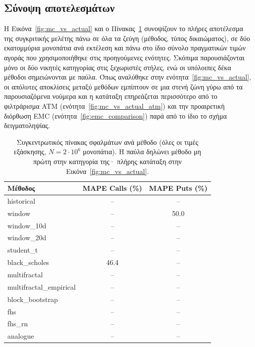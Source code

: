 \documentclass[12pt]{article}
\begin{document}
\subsection{Σύνοψη αποτελεσμάτων}

Η Εικόνα~\ref{fig:mc_vs_actual} και ο Πίνακας~\ref{tab:summary} συνοψίζουν το πλήρες αποτέλεσμα της συγκριτικής μελέτης πάνω σε όλα τα ζεύγη (μέθοδος, τύπος δικαιώματος), σε δύο εκατομμύρια μονοπάτια ανά εκτέλεση και πάνω στο ίδιο σύνολο πραγματικών τιμών αγοράς που χρησιμοποιήθηκε στις προηγούμενες ενότητες. Σκόπιμα παρουσιάζονται μόνο οι δύο νικητές κατηγορίας στις ξεχωριστές στήλες, ενώ οι υπόλοιπες δέκα μέθοδοι σημειώνονται με παύλα. Όπως αναλύθηκε στην ενότητα~\ref{fig:mc_vs_actual}, οι απόλυτες αποκλίσεις μεταξύ μεθόδων εμπίπτουν σε μια στενή ζώνη γύρω από τα παρουσιαζόμενα νούμερα και η κατάταξη επηρεάζεται περισσότερο από το φιλτράρισμα ATM (ενότητα~\ref{fig:mc_vs_actual_atm}) και την προαιρετική διόρθωση EMC (ενότητα~\ref{fig:emc_comparison}) παρά από το ίδιο το σχήμα δειγματοληψίας.

\begin{table}[h]
\centering
\begin{tabular}{lcc}
\hline
Μέθοδος & MAPE Calls (\%) & MAPE Puts (\%) \\ \hline
historical               & -- & -- \\
window                   & -- & 50.0 \\
window\_10d              & -- & -- \\
window\_20d              & -- & -- \\
student\_t               & -- & -- \\
black\_scholes           & 46.4 & -- \\
multifractal             & -- & -- \\
multifractal\_empirical  & -- & -- \\
block\_bootstrap         & -- & -- \\
fhs                      & -- & -- \\
fhs\_rn                  & -- & -- \\
analogue                 & -- & -- \\ \hline
\end{tabular}
\caption{Συγκεντρωτικός πίνακας σφαλμάτων ανά μέθοδο (όλες οι τιμές εξάσκησης, $N = 2 \cdot 10^6$ μονοπάτια). Η παύλα δηλώνει μέθοδο μη πρώτη στην κατηγορία της· πλήρης κατάταξη στην Εικόνα~\ref{fig:mc_vs_actual}.}
\label{tab:summary}
\end{table}
\end{document}
